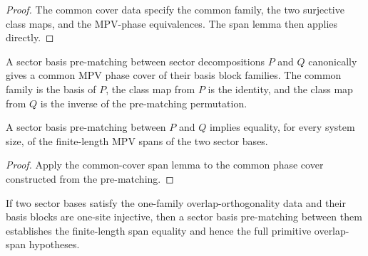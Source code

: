 \begin{proof}
	\leanok
	The common cover data specify the common family, the two surjective class maps,
	and the MPV-phase equivalences. The span lemma then applies directly.
\end{proof}

\begin{definition}%
\label{def:sector_basis_pre_matching_common_phase_cover}
	\leanok
	A sector basis pre-matching between sector decompositions $P$ and $Q$
	canonically gives a common MPV phase cover of their basis block families.  The
	common family is the basis of $P$, the class map from $P$ is the identity, and
	the class map from $Q$ is the inverse of the pre-matching permutation.
\end{definition}

\begin{lemma}%
\label{lem:sector_basis_pre_matching_span_eq}
	\leanok
	A sector basis pre-matching between $P$ and $Q$ implies equality, for every
	system size, of the finite-length MPV spans of the two sector bases.
\end{lemma}

\begin{proof}
	\leanok
	Apply the common-cover span lemma to the common phase cover constructed from
	the pre-matching.
\end{proof}

\begin{lemma}%
\label{lem:sector_basis_pre_matching_to_overlap_span}
	\leanok
	If two sector bases satisfy the one-family overlap-orthogonality data and their
	basis blocks are one-site injective, then a sector basis pre-matching between
	them establishes the finite-length span equality and hence the full primitive
	overlap-span hypotheses.
\end{lemma}

